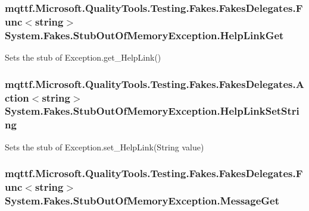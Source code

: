 \hypertarget{class_system_1_1_fakes_1_1_stub_out_of_memory_exception_a472bd585f13ae0a59dc68babc6ebe809}{
\subsubsection[{Help\-Link\-Get}]{\setlength{\rightskip}{0pt plus 5cm}mqttf.\-Microsoft.\-Quality\-Tools.\-Testing.\-Fakes.\-Fakes\-Delegates.\-Func$<$string$>$ System.\-Fakes.\-Stub\-Out\-Of\-Memory\-Exception.\-Help\-Link\-Get}}\label{class_system_1_1_fakes_1_1_stub_out_of_memory_exception_a472bd585f13ae0a59dc68babc6ebe809}


Sets the stub of Exception.\-get\-\_\-\-Help\-Link()

\hypertarget{class_system_1_1_fakes_1_1_stub_out_of_memory_exception_a9796f927e8a14236add79d5b3689b56c}{
\subsubsection[{Help\-Link\-Set\-String}]{\setlength{\rightskip}{0pt plus 5cm}mqttf.\-Microsoft.\-Quality\-Tools.\-Testing.\-Fakes.\-Fakes\-Delegates.\-Action$<$string$>$ System.\-Fakes.\-Stub\-Out\-Of\-Memory\-Exception.\-Help\-Link\-Set\-String}}\label{class_system_1_1_fakes_1_1_stub_out_of_memory_exception_a9796f927e8a14236add79d5b3689b56c}


Sets the stub of Exception.\-set\-\_\-\-Help\-Link(\-String value)

\hypertarget{class_system_1_1_fakes_1_1_stub_out_of_memory_exception_a6ca608cbd6ccb8fa5f4512a91bd04b03}{
\subsubsection[{Message\-Get}]{\setlength{\rightskip}{0pt plus 5cm}mqttf.\-Microsoft.\-Quality\-Tools.\-Testing.\-Fakes.\-Fakes\-Delegates.\-Func$<$string$>$ System.\-Fakes.\-Stub\-Out\-Of\-Memory\-Exception.\-Message\-Get}}\label{class_system_1_1_fakes_1_1_stub_out_of_memory_exception_a6ca608cbd6ccb8fa5f4512a91bd04b03}


